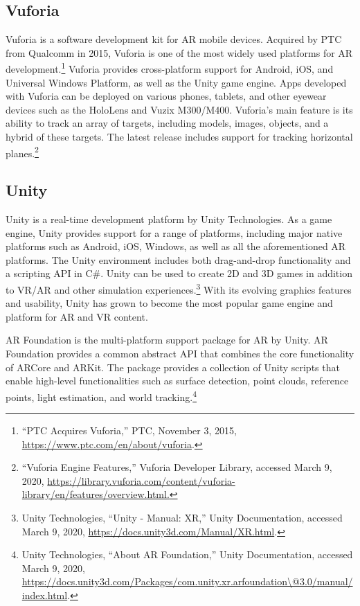 \subsection{Vuforia}
Vuforia is a software development kit for AR mobile devices. Acquired by PTC from Qualcomm in 2015, Vuforia is one of the most widely used platforms for AR development.\footnote{“PTC Acquires Vuforia,” PTC, November 3, 2015, \url{https://www.ptc.com/en/about/vuforia}.} Vuforia provides cross-platform support for Android, iOS, and Universal Windows Platform, as well as the Unity game engine. Apps developed with Vuforia can be deployed on various phones, tablets, and other eyewear devices such as the HoloLens and Vuzix M300/M400. Vuforia's main feature is its ability to track an array of targets, including models, images, objects, and a hybrid of these targets. The latest release includes support for tracking horizontal planes.\footnote{“Vuforia Engine Features,” Vuforia Developer Library, accessed March 9, 2020, \url{https://library.vuforia.com/content/vuforia-library/en/features/overview.html.}}

\subsection{Unity}
Unity is a real-time development platform by Unity Technologies. As a game engine, Unity provides support for a range of platforms, including major native platforms such as Android, iOS, Windows, as well as all the aforementioned AR platforms. The Unity environment includes both drag-and-drop functionality and a scripting API in C\#. Unity can be used to create 2D and 3D games in addition to VR/AR and other simulation experiences.\footnote{Unity Technologies, “Unity - Manual: XR,” Unity Documentation, accessed March 9, 2020, \url{https://docs.unity3d.com/Manual/XR.html}.} With its evolving graphics features and usability, Unity has grown to become the most popular game engine and platform for AR and VR content.

AR Foundation is the multi-platform support package for AR by Unity. AR Foundation provides a common abstract API that combines the core functionality of ARCore and ARKit. The package provides a collection of Unity scripts that enable high-level functionalities such as surface detection, point clouds, reference points, light estimation, and world tracking.\footnote{Unity Technologies, “About AR Foundation,” Unity Documentation, accessed March 9, 2020, \url{https://docs.unity3d.com/Packages/com.unity.xr.arfoundation\@3.0/manual/index.html}.}

